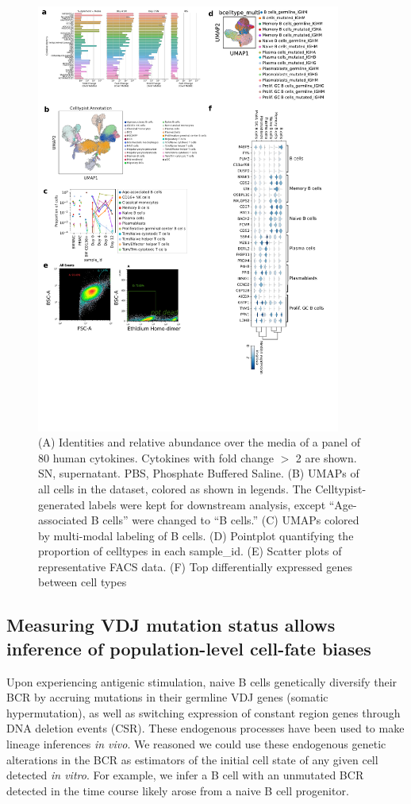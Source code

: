 \begin{figure}[hbt!]
\centering
\includegraphics[width=10cm, keepaspectratio]{figs/InVitro/figS1_bcd.pdf}
\caption[Analysis of stimulation cocktail and presentation of pre-processing steps.]{(A) Identities and relative abundance over the media of a panel of 80 human cytokines. Cytokines with fold change $>$ 2 are shown. SN, supernatant. PBS, Phosphate Buffered Saline. (B) UMAPs of all cells in the dataset, colored as shown in legends. The Celltypist-generated labels were kept for downstream analysis, except “Age-associated B cells” were changed to “B cells.” (C) UMAPs colored by multi-modal labeling of B cells. (D) Pointplot quantifying the proportion of celltypes in each sample\_id. (E) Scatter plots of representative FACS data. (F) Top differentially expressed genes between cell types}
\label{fig:paper2_fig_s1}
\end{figure}


\subsection{Measuring VDJ mutation status allows inference of population-level cell-fate biases}

Upon experiencing antigenic stimulation, naive B cells genetically diversify their BCR by accruing mutations in their germline VDJ genes (somatic hypermutation), as well as switching expression of constant region genes through DNA deletion events (CSR). These endogenous processes have been used to make lineage inferences \textit{in vivo}\cite{horns_lineage_2016}. We reasoned we could use these endogenous genetic alterations in the BCR as estimators of the initial cell state of any given cell detected \textit{in vitro}. For example, we infer a B cell with an unmutated BCR detected in the time course likely arose from a naive B cell progenitor.

